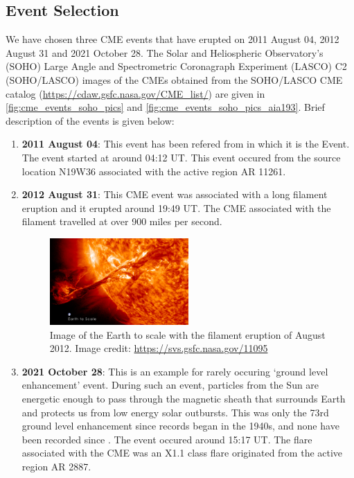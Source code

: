 \message{ !name(main.tex)}\documentclass[12pt]{article}
\begin{document}
\subsection{Event Selection}
\label{sec:selection_of_events}

We have chosen three CME events that have erupted on 2011 August 04, 2012 August 31 and 2021 October 28. The Solar and Heliospheric Observatory's  (SOHO) Large Angle and Spectrometric Coronagraph Experiment (LASCO) C2 (SOHO/LASCO) images of the CMEs obtained from the SOHO/LASCO CME catalog (\url{https://cdaw.gsfc.nasa.gov/CME_list/}) are given in \cref{fig:cme_events_soho_pics} and \cref{fig:cme_events_soho_pics_aia193}. Brief description of the events is given below:\\

\begin{enumerate}

        \item\textbf{2011 August 04}: This event has been refered from \citep{Mason2016} in which it is the  Event. The event started at around 04:12 UT. This event occured from the source location N19W36 associated with the active region AR 11261.

        \item\textbf{2012 August 31}: This CME event was associated with a long filament eruption and it erupted around 19:49 UT. The CME associated with the filament travelled at over 900 miles per second.

    \begin{figure}[ht]
        \centering
        \includegraphics[width=0.5\textwidth]{images/aug_31_2012_event_sun_earth_image.jpg}
        \caption[Image of the Earth to scale of the 2012 August]{Image of the Earth to scale with the filament eruption of  August 2012. Image credit: \url{https://svs.gsfc.nasa.gov/11095}}
        \label{fig:sun_earth_aug_31_2012}
    \end{figure}

        \item\textbf{2021 October 28}: This is an example for rarely occuring `ground level enhancement' event. During such an event, particles from the Sun are energetic enough to pass through the magnetic sheath that surrounds Earth and protects us from low energy solar outbursts. This was only the 73rd ground level enhancement since records began in the 1940s, and none have been recorded since \citep{Klein2022}. The event occured around 15:17 UT. The flare associated with the CME was an X1.1 class flare originated from the active region AR 2887.\\

\end{enumerate}
\end{document}
